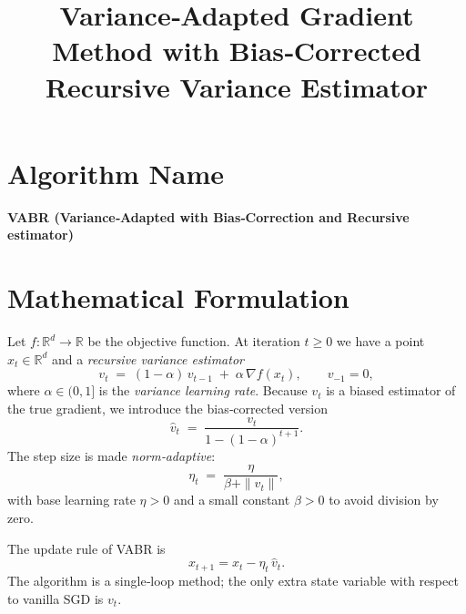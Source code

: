 \documentclass{article}
\newcommand{\R}{\mathbb{R}}
\begin{document}
\title{Variance‑Adapted Gradient Method with Bias‑Corrected Recursive Variance Estimator}
\author{}
\date{}
\maketitle

\tableofcontents

\bigskip

\section*{Algorithm Name}
\textbf{VABR (Variance‑Adapted with Bias‑Correction and Recursive estimator)}  

\section{Mathematical Formulation}
Let $f:\R^{d}\rightarrow\R$ be the objective function.  
At iteration $t\ge 0$ we have a point $x_t\in\R^{d}$ and a \emph{recursive variance estimator}
\begin{equation}
    v_t \;=\;(1-\alpha)\,v_{t-1}\;+\;\alpha\,\nabla f(x_t),\qquad v_{-1}=0,
    \label{eq:vt}
\end{equation}
where $\alpha\in(0,1]$ is the \emph{variance learning rate}.  
Because $v_t$ is a biased estimator of the true gradient, we introduce the bias‑corrected version
\begin{equation}
    \hat v_t \;=\;\frac{v_t}{1-(1-\alpha)^{t+1}} .
    \label{eq:hatvt}
\end{equation}
The step size is made \emph{norm‑adaptive}:
\begin{equation}
    \eta_t \;=\;\frac{\eta}{\beta+\|\hat v_t\|},
    \label{eq:et}
\end{equation}
with base learning rate $\eta>0$ and a small constant $\beta>0$ to avoid division by zero.

The update rule of VABR is
\begin{equation}
    x_{t+1}=x_t-\eta_t\,\hat v_t .
    \label{eq:update}
\end{equation}
The algorithm is a single‑loop method; the only extra state variable with respect to vanilla SGD is $v_t$.

\end{document}

